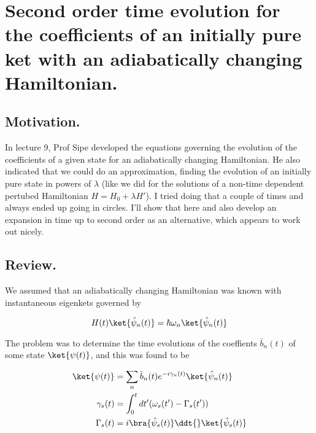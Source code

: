 
%

\chapter{Second order time evolution for the coefficients of an initially pure ket with an adiabatically changing Hamiltonian.}
\label{chap:adiabaticApprox}
{}
\date{Nov 11, 2011}

\beginArtWithToc

\section{Motivation.}

In lecture 9, Prof Sipe developed the equations governing the evolution of the coefficients of a given state for an adiabatically changing Hamiltonian.  He also indicated that we could do an approximation, finding the evolution of an initially pure state in powers of $\lambda$ (like we did for the solutions of a non-time dependent pertubed Hamiltonian $H = H_0 + \lambda H'$).  I tried doing that a couple of times and always ended up going in circles.  I'll show that here and also develop an expansion in time up to second order as an alternative, which appears to work out nicely.

\section{Review.}

We assumed that an adiabatically changing Hamiltonian was known with instantaneous eigenkets governed by

\begin{equation}\label{eqn:adiabaticApprox:10}
H(t) \ket{\hat{\psi}_n(t)} = \hbar \omega_n \ket{\hat{\psi}_n(t)} 
\end{equation}

The problem was to determine the time evolutions of the coeffients $\bar{b}_n(t)$ of some state $\ket{\psi(t)}$, and this was found to be

\begin{align}\label{eqn:adiabaticApprox:30}
\ket{\psi(t)} &= \sum_n \bar{b}_n(t) e^{-i \gamma_n(t)} \ket{\hat{\psi}_n(t)} \\
\gamma_s(t) &= \int_0^t dt' (\omega_s(t') - \Gamma_s(t')) \\
\Gamma_s(t) &= i \bra{\hat{\psi}_s(t)} \ddt{} \ket{\hat{\psi}_s(t)} 
\end{align}

